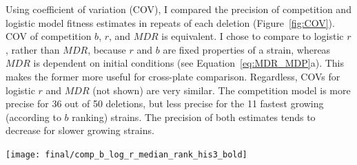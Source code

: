 \begin{multicols}{2}
Using coefficient of variation (COV), I compared the precision of
competition and logistic model fitness estimates in repeats of each
deletion (Figure~\ref{fig:COV}). COV of competition \(b\), \(r\), and
\(MDR\) is equivalent. I chose to compare to logistic \(r\), rather
than \(MDR\), because \(r\) and \(b\) are fixed properties of a
strain, whereas \(MDR\) is dependent on initial conditions (see
Equation~\ref{eq:MDR_MDP}a). This makes the former more useful for
cross-plate comparison. Regardless, COVs for logistic \(r\) and
\(MDR\) (not shown) are very similar.
The competition model is more precise for 36 out of 50 deletions, but
less precise for the 11 fastest growing (according to \(b\) ranking)
strains. The precision of both estimates tends to decrease for slower
growing strains.





\end{multicols}
\graphicspath{{images/COV/}}
\begin{Figure}
  \centering
  \texttt{[image: final/comp\_b\_log\_r\_median\_rank\_his3\_bold]}
  \label{fig:COV}
\end{Figure}

